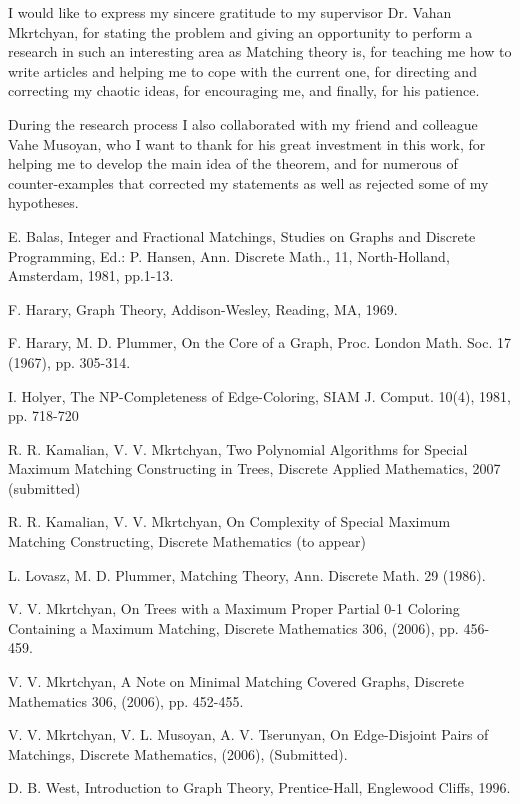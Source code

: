 \documentclass[a4paper, 12pt]{article}
\newenvironment{acknowledgements}[1][Acknowledgements]{\begin{trivlist}
\item[\hskip \labelsep {\bfseries #1}]}{\end{trivlist}}
\begin{document}
\vspace*{2cm}

\begin{acknowledgements}
\begin{center}
\end{center}
I would like to express my sincere gratitude to my supervisor Dr.
Vahan Mkrtchyan, for stating the problem and giving an opportunity
to perform a research in such an interesting area as Matching theory
is, for teaching me how to write articles and helping me to cope
with the current one, for directing and correcting my chaotic ideas,
for encouraging me, and finally, for his patience.

During the research process I also collaborated with my friend and
colleague Vahe Musoyan, who I want to thank for his great investment
in this work, for helping me to develop the main idea of
 the theorem, and for numerous of counter-examples that corrected my
statements as well as rejected some of my hypotheses.
\end{acknowledgements}


\newpage

\begin{center}

\begin{thebibliography}{0}

 E. Balas, Integer and Fractional Matchings, Studies
on Graphs and Discrete Programming, Ed.: P. Hansen, Ann. Discrete
Math., 11, North-Holland, Amsterdam, 1981, pp.1-13.

 F. Harary, Graph Theory, Addison-Wesley, Reading, MA,
1969.

 F. Harary, M. D. Plummer, On the Core of a Graph,
Proc. London Math. Soc. 17 (1967), pp. 305-314.

 I. Holyer, The NP-Completeness of Edge-Coloring,
SIAM J. Comput. 10(4), 1981, pp. 718-720

 R. R. Kamalian, V. V. Mkrtchyan, Two Polynomial
Algorithms for Special Maximum Matching Constructing in Trees,
Discrete Applied Mathematics, 2007 (submitted)

 R. R. Kamalian, V. V. Mkrtchyan, On Complexity of Special
Maximum Matching Constructing, Discrete Mathematics (to appear)

 L. Lovasz, M. D. Plummer, Matching Theory, Ann. Discrete Math.
29 (1986).

 V. V. Mkrtchyan, On Trees with a Maximum Proper
Partial 0-1 Coloring Containing a Maximum Matching, Discrete
Mathematics 306, (2006), pp. 456-459.

 V. V. Mkrtchyan, A Note on Minimal Matching Covered Graphs, Discrete
Mathematics 306, (2006), pp. 452-455.

 V. V. Mkrtchyan, V. L. Musoyan, A. V. Tserunyan, On
Edge-Disjoint Pairs of Matchings, Discrete Mathematics, (2006),
(Submitted).

 D. B. West, Introduction to Graph Theory,
Prentice-Hall, Englewood Cliffs, 1996.

\end{thebibliography}
\end{center}
\end{document}
